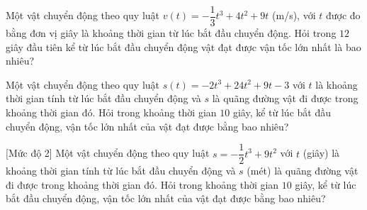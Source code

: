 \begin{bt}%
	Một vật chuyển động theo  quy luật $v(t)=-\dfrac{1}{3}t^3+4t^2+9t$ (m/s), với $t$ được đo bằng đơn vị giây là khoảng thời gian từ lúc bắt đầu chuyển động. Hỏi trong $12$ giây đầu tiên kể từ lúc bắt đầu chuyển động vật đạt được vận tốc lớn nhất là bao nhiêu?
\end{bt}

\begin{bt}%
	Một vật chuyển động theo quy luật $s(t)=-2t^3+24t^2+9t-3$ với $t$ là khoảng thời gian tính từ lúc bắt đầu chuyển động và $s$ là quãng đường vật đi được trong khoảng thời gian đó. Hỏi trong khoảng  thời gian $10$ giây, kể từ lúc bắt đầu chuyển động, vận tốc lớn nhất của vật đạt được bằng bao nhiêu?
\end{bt}

\begin{bt}%
[Mức độ 2]%
	Một vật chuyển động theo quy luật $s=-\dfrac{1}{2}t^3+9t^2$ với $t$ (giây) là khoảng thời gian tính từ lúc bắt đầu chuyển động và $s$ (mét) là quãng đường vật đi được trong khoảng thời gian đó. Hỏi trong khoảng thời gian $10$ giây, kể từ lúc bắt đầu chuyển động, vận tốc lớn nhất của vật đạt được bằng bao nhiêu?
\end{bt}

